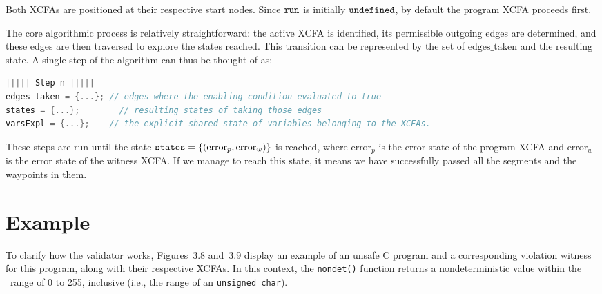 Both XCFAs are positioned at their respective start nodes. Since $\text{\texttt{run}}$ is
initially $\text{\texttt{undefined}}$, by default the program XCFA proceeds first.

The core algorithmic process is relatively straightforward: the active XCFA is identified, its
permissible outgoing edges are determined, and these edges are then traversed to explore the states
reached. This transition can be represented by the set of $\text{edges\_taken}$ and the resulting
state. A single step of the algorithm can thus be thought of as:
\begin{lstlisting}[style=C, language=C]
||||| Step n |||||
edges_taken = {...}; // edges where the enabling condition evaluated to true
states = {...};        // resulting states of taking those edges
varsExpl = {...};    // the explicit shared state of variables belonging to the XCFAs.
\end{lstlisting}
These steps are run until the state $\text{\texttt{states}} = \{(\text{error}_p, \text{error}_w)\}$ is reached,
where $\text{error}_p$ is the error state of the program XCFA and $\text{error}_w$ is the error state of the
witness XCFA. If we manage to reach this state, it means we have successfully passed all the segments
and the waypoints in them.


\section{Example}
To clarify how the validator works, Figures~3.8 and~3.9 display an example of an unsafe C program 
and a corresponding violation witness for this program, along with their respective XCFAs.
In this context, the \texttt{nondet()} function returns a nondeterministic value within the \
range of 0 to 255, inclusive (i.e., the range of an \texttt{unsigned char}).

